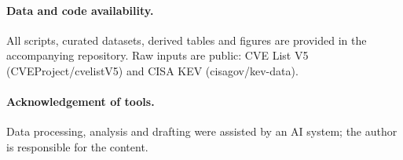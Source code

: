 \paragraph{Data and code availability.} All scripts, curated datasets, derived tables and figures are provided in the accompanying repository. Raw inputs are public: CVE List V5 (CVEProject/cvelistV5) and CISA KEV (cisagov/kev-data).

\paragraph{Acknowledgement of tools.} Data processing, analysis and drafting were assisted by an AI system; the author is responsible for the content.
